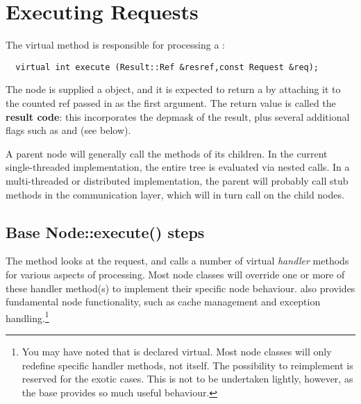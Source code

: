 \chapter{Executing Requests}

  The virtual  method is responsible for processing a
  \Request:
  
  \begin{verbatim}
  virtual int execute (Result::Ref &resref,const Request &req);
  \end{verbatim}
  
  \noindent The node is supplied a  object, and it is expected to return a
   by attaching it to the counted ref passed in as the first
  argument. The return value is called the {\bf result code}: this
  incorporates the depmask of the result, plus several additional flags such
  as  and  (see below).

  A parent node will generally call the  methods of its
  children. In the current single-threaded implementation, the entire tree
  is evaluated via nested  calls. In a multi-threaded or
  distributed implementation, the parent will probably call stub methods in
  the communication layer, which will in turn call  on the
  child nodes.


  
  \section{Base Node::execute() steps}
  
  The  method looks at the request, and calls a number
  of virtual {\em handler} methods for various aspects of processing. Most
  node classes will override one or more of these handler method(s) to
  implement their specific node behaviour.  also
  provides fundamental node functionality, such as cache management and
  exception handling.\footnote{You may have noted that  is
  declared virtual. Most node classes will only redefine specific handler
  methods, not  itself.  The possibility to reimplement
   is reserved for the exotic cases. This is not to be
  undertaken lightly, however, as the base  provides so
  much useful behaviour.}

